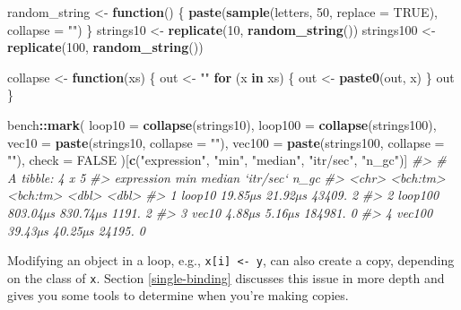 \documentclass[]{book}
\newenvironment{Shaded}{\begin{snugshade}}{\end{snugshade}}
\newcommand{\CommentTok}[1]{\textcolor[rgb]{0.37,0.37,0.37}{\textit{#1}}}
\newcommand{\ControlFlowTok}[1]{\textcolor[rgb]{0.27,0.27,0.27}{\textbf{#1}}}
\newcommand{\DataTypeTok}[1]{\textcolor[rgb]{0.27,0.27,0.27}{#1}}
\newcommand{\DecValTok}[1]{\textcolor[rgb]{0.06,0.06,0.06}{#1}}
\newcommand{\KeywordTok}[1]{\textcolor[rgb]{0.27,0.27,0.27}{\textbf{#1}}}
\newcommand{\NormalTok}[1]{#1}
\newcommand{\OperatorTok}[1]{\textcolor[rgb]{0.43,0.43,0.43}{\textbf{#1}}}
\newcommand{\OtherTok}[1]{\textcolor[rgb]{0.37,0.37,0.37}{#1}}
\newcommand{\StringTok}[1]{\textcolor[rgb]{0.5,0.5,0.5}{#1}}
\begin{document}
\begin{Shaded}
\begin{Highlighting}[]
\NormalTok{random_string <-}\StringTok{ }\ControlFlowTok{function}\NormalTok{() \{}
  \KeywordTok{paste}\NormalTok{(}\KeywordTok{sample}\NormalTok{(letters, }\DecValTok{50}\NormalTok{, }\DataTypeTok{replace =} \OtherTok{TRUE}\NormalTok{), }\DataTypeTok{collapse =} \StringTok{""}\NormalTok{)}
\NormalTok{\}}
\NormalTok{strings10 <-}\StringTok{ }\KeywordTok{replicate}\NormalTok{(}\DecValTok{10}\NormalTok{, }\KeywordTok{random_string}\NormalTok{())}
\NormalTok{strings100 <-}\StringTok{ }\KeywordTok{replicate}\NormalTok{(}\DecValTok{100}\NormalTok{, }\KeywordTok{random_string}\NormalTok{())}

\NormalTok{collapse <-}\StringTok{ }\ControlFlowTok{function}\NormalTok{(xs) \{}
\NormalTok{  out <-}\StringTok{ ""}
  \ControlFlowTok{for}\NormalTok{ (x }\ControlFlowTok{in}\NormalTok{ xs) \{}
\NormalTok{    out <-}\StringTok{ }\KeywordTok{paste0}\NormalTok{(out, x)}
\NormalTok{  \}}
\NormalTok{  out}
\NormalTok{\}}

\NormalTok{bench}\OperatorTok{::}\KeywordTok{mark}\NormalTok{(}
  \DataTypeTok{loop10  =} \KeywordTok{collapse}\NormalTok{(strings10),}
  \DataTypeTok{loop100 =} \KeywordTok{collapse}\NormalTok{(strings100),}
  \DataTypeTok{vec10   =} \KeywordTok{paste}\NormalTok{(strings10, }\DataTypeTok{collapse =} \StringTok{""}\NormalTok{),}
  \DataTypeTok{vec100  =} \KeywordTok{paste}\NormalTok{(strings100, }\DataTypeTok{collapse =} \StringTok{""}\NormalTok{),}
  \DataTypeTok{check =} \OtherTok{FALSE}
\NormalTok{)[}\KeywordTok{c}\NormalTok{(}\StringTok{"expression"}\NormalTok{, }\StringTok{"min"}\NormalTok{, }\StringTok{"median"}\NormalTok{, }\StringTok{"itr/sec"}\NormalTok{, }\StringTok{"n_gc"}\NormalTok{)]}
\CommentTok{#> # A tibble: 4 x 5}
\CommentTok{#>   expression      min   median `itr/sec`  n_gc}
\CommentTok{#>   <chr>      <bch:tm> <bch:tm>     <dbl> <dbl>}
\CommentTok{#> 1 loop10      19.85µs  21.92µs    43409.     2}
\CommentTok{#> 2 loop100    803.04µs 830.74µs     1191.     2}
\CommentTok{#> 3 vec10        4.88µs   5.16µs   184981.     0}
\CommentTok{#> 4 vec100      39.43µs  40.25µs    24195.     0}
\end{Highlighting}
\end{Shaded}

Modifying an object in a loop, e.g., \texttt{x{[}i{]}\ \textless{}-\ y}, can also create a copy, depending on the class of \texttt{x}. Section \ref{single-binding} discusses this issue in more depth and gives you some tools to determine when you're making copies.
\end{document}
